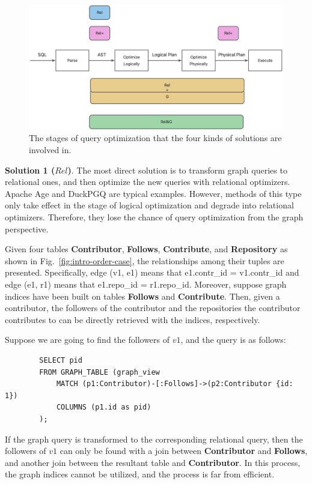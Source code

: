 {\begin{figure}
    \centering
    \includegraphics[width=.6\linewidth]{./figures/catagory.png}
    \caption{The stages of query optimization that the four kinds of solutions are involved in.}
    \label{fig:catagory}
\end{figure}

\textbf{Solution 1 ($Rel$)}.
The most direct solution is to transform graph queries to relational ones, and then optimize the new queries with relational optimizers.
Apache Age \cite{apache-age} and DuckPGQ \cite{DuckPGQ,DuckPGQ-VLDB} are typical examples.
However, methods of this type only take effect in the stage of logical optimization and degrade into relational optimizers.
Therefore, they lose the chance of query optimization from the graph perspective.

\begin{example}
    Given four tables \textbf{Contributor}, \textbf{Follows}, \textbf{Contribute}, and \textbf{Repository} as shown in Fig.~\ref{fig:intro-order-case}, the relationships among their tuples are presented.
    Specifically, edge (v1, e1) means that e1.contr\_id = v1.contr\_id and edge (e1, r1) means that e1.repo\_id = r1.repo\_id.
    Moreover, suppose graph indices have been built on tables \textbf{Follows} and \textbf{Contribute}.
    Then, given a contributor, the followers of the contributor and the repositories the contributor contributes to can be directly retrieved with the indices, respectively.

    Suppose we are going to find the followers of $v1$, and the query is as follows:
    \begin{lstlisting}
        SELECT pid
        FROM GRAPH_TABLE (graph_view
            MATCH (p1:Contributor)-[:Follows]->(p2:Contributor {id: 1})
            COLUMNS (p1.id as pid)
        );
    \end{lstlisting}
    If the graph query is transformed to the corresponding relational query, then the followers of $v1$ can only be found with a join between \textbf{Contributor} and \textbf{Follows}, and another join between the resultant table and \textbf{Contributor}.
    In this process, the graph indices cannot be utilized, and the process is far from efficient.
\end{example}


}
